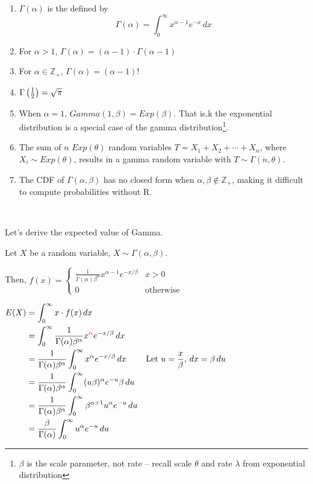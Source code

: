 \begin{enumerate}
    \item $\Gamma(\alpha)$ is the  defined by $$\Gamma(\alpha) = \int_0^\infty x^{\alpha-1}e^{-x} \,dx$$
    \item For $\alpha > 1$, $\Gamma(\alpha) = (\alpha - 1) \cdot \Gamma(\alpha - 1)$
    \item For $\alpha \in \mathbb{Z}_+$, $\Gamma(\alpha) = (\alpha - 1)!$
    \item $\Gamma\left(\frac{1}{2}\right) = \sqrt{\pi}$
    \item When $\alpha = 1$, $Gamma(1, \beta) = Exp(\beta)$. That is,k the exponential distribution is a special case of the gamma distribution\footnote{$\beta$ is the scale parameter, not rate -- recall scale $\theta$ and rate $\lambda$ from exponential distribution}.
    \item The sum of $n$  $Exp(\theta)$ random variables $T = X_1 + X_2 + \cdots + X_n$, where $X_i \sim Exp(\theta)$, results in a gamma random variable with $T \sim \Gamma(n, \theta)$.
    \item The CDF of $\Gamma(\alpha, \beta)$ has no closed form when $\alpha, \beta \notin \mathbb{Z}_+$, making it difficult to compute probabilities without R. 
\end{enumerate}

{~~~}

Let's derive the expected value of Gamma.

Let $X$ be a random variable, $X \sim \Gamma(\alpha, \beta)$. 

Then, $f(x) = \begin{cases} \frac{1}{\Gamma(\alpha) \beta^\alpha} x^{\alpha-1} e^{-x/\beta} & x > 0 \\ 0 & \text{otherwise} \end{cases}$

$\allowdisplaybreaks \begin{aligned}[t]
    E(X) & = \int_0^\infty x \cdot f(x) \,dx                                                              \\
         & = \int_0^\infty \frac{1}{\Gamma(\alpha) \beta^\alpha} x^{\color{red} \alpha} e^{-x/\beta} \,dx \\
         & = \frac{1}{\Gamma(\alpha)\beta^\alpha} \int_0^\infty x^\alpha e^{-x/\beta} \,dx
         & \text{Let $u = \frac{x}{\beta}$, $dx = \beta \,du$}                                            \\
         & = \frac{1}{\Gamma(\alpha)\beta^\alpha} \int_0^\infty (u\beta)^\alpha e^{-u} \beta \,du         \\
         & = \frac{1}{\Gamma(\alpha)\beta^\alpha} \int_0^\infty \beta^{\alpha+1} u^\alpha e^{-u} \,du     \\
         & = \frac{\beta}{\Gamma(\alpha)} \int_0^\infty u^\alpha e^{-u} \,du
\end{aligned}$

